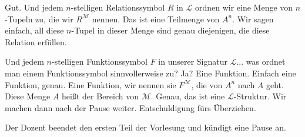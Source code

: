 \begin{spoken-clean}[00:43:40 - 00:46:01]
Gut. Und jedem $n$-stelligen Relationssymbol $R$ in $\mathcal{L}$ ordnen wir eine Menge von $n$-Tupeln zu, die wir $R^{\mathcal{M}}$ nennen. Das ist eine Teilmenge von $A^n$. Wir sagen einfach, all diese $n$-Tupel in dieser Menge sind genau diejenigen, die diese Relation erfüllen.

Und jedem $n$-stelligen Funktionssymbol $F$ in unserer Signatur $\mathcal{L}$... was ordnet man einem Funktionssymbol sinnvollerweise zu? Ja? Eine Funktion. Einfach eine Funktion, genau. Eine Funktion, wir nennen sie $F^{\mathcal{M}}$, die von $A^n$ nach $A$ geht. Diese Menge $A$ heißt der Bereich von $\mathcal{M}$. Genau, das ist eine $\mathcal{L}$-Struktur. Wir machen dann nach der Pause weiter. Entschuldigung fürs Überziehen.
\end{spoken-clean}

\begin{math-stroke}
\end{math-stroke}

\begin{lecture-break}[Pause]
Der Dozent beendet den ersten Teil der Vorlesung und kündigt eine Pause an.
\end{lecture-break}

